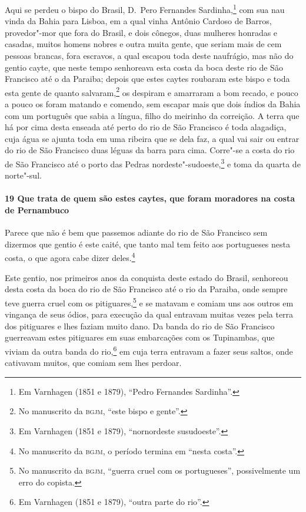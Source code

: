 Aqui se perdeu o bispo do Brasil, D.~Pero Fernandes Sardinha,\footnote{ Em Varnhagen (1851
e 1879), ``Pedro Fernandes Sardinha''.} com sua nau vinda da Bahia para Lisboa, em a qual
vinha Antônio Cardoso de Barros, provedor"-mor que fora do Brasil, e dois cônegos, duas
mulheres honradas e casadas, muitos homens nobres e outra muita gente, que seriam mais de
cem pessoas brancas, fora escravos, a qual escapou toda deste naufrágio, mas não do gentio
cayte, que neste tempo senhoreava esta costa da boca deste rio de São Francisco até o da
Paraiba; depois que estes caytes roubaram este bispo e toda esta gente de quanto
salvaram,\footnote{ No manuscrito da \textsc{bgjm}, ``este bispo e gente''.} os despiram e
amarraram a bom recado, e pouco a pouco os foram matando e comendo, sem escapar mais que
dois índios da Bahia com um português que sabia a língua, filho do meirinho da correição.
A terra que há por cima desta enseada até perto do rio de São Francisco é toda alagadiça,
cuja água se ajunta toda em uma ribeira que se dela faz, a qual vai sair ou entrar do rio
de São Francisco duas léguas da barra para cima. Corre"-se a costa do rio de São Francisco
até o porto das Pedras nordeste"-sudoeste,\footnote{ Em Varnhagen (1851 e 1879),
``nornordeste susudoeste''.} e toma da quarta de norte"-sul.

\paragraph{19 Que trata de quem são estes caytes, que foram moradores na costa de
Pernambuco}

Parece que não é bem que passemos adiante do rio de São Francisco sem dizermos que gentio
é este caité, que tanto mal tem feito aos portugueses nesta costa, o que agora cabe dizer
deles.\footnote{ No manuscrito da \textsc{bgjm}, o período termina em ``nesta costa''.}

Este gentio, nos primeiros anos da conquista deste estado do Brasil, senhoreou desta costa
da boca do rio de São Francisco até o rio da Paraiba, onde sempre teve guerra cruel com os
pitiguares,\footnote{ No manuscrito da \textsc{bgjm}, ``guerra cruel com os portugueses'',
possivelmente um erro do copista.} e se matavam e comiam uns aos outros em vingança de
seus ódios, para execução da qual entravam muitas vezes pela terra dos pitiguares e lhes
faziam muito dano. Da banda do rio de São Francisco guerreavam estes pitiguares em suas
embarcações com os Tupinambas, que viviam da outra banda do rio,\footnote{ Em Varnhagen
(1851 e 1879), ``outra parte do rio''.} em cuja terra entravam a fazer seus saltos, onde
cativavam muitos, que comiam sem lhes perdoar.

